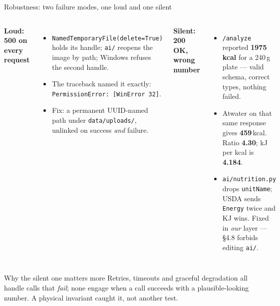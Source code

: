 \documentclass[aspectratio=169,11pt]{beamer}
\begin{document}
\begin{frame}{Robustness: two failure modes, one loud and one silent}
  \begin{columns}[T,onlytextwidth]
  \textbf{Loud: 500 on every request}
  \begin{itemize}\setlength\itemsep{0.2em}\small
    \item \texttt{NamedTemporaryFile(delete=True)} holds its handle; \texttt{ai/} reopens the image by path; Windows refuses the second handle.
    \item The traceback named it exactly: \texttt{PermissionError: [WinError 32]}.
    \item Fix: a permanent UUID-named path under \texttt{data/uploads/}, unlinked on success \emph{and} failure.
  \end{itemize}

  \textbf{Silent: 200 OK, wrong number}
  \begin{itemize}\setlength\itemsep{0.2em}\small
    \item \texttt{/analyze} reported \textbf{1975\,kcal} for a 240\,g plate --- valid schema, correct types, nothing failed.
    \item Atwater on that same response gives \textbf{459}\,kcal. Ratio \textbf{4.30}; kJ per kcal is \textbf{4.184}.
    \item \texttt{ai/nutrition.py} drops \texttt{unitName}; USDA sends \texttt{Energy} twice and KJ wins. Fixed in \emph{our} layer --- \S4.8 forbids editing \texttt{ai/}.
  \end{itemize}
  \end{columns}

  \vspace{0.2em}
  \begin{block}{Why the silent one matters more}
    \small Retries, timeouts and graceful degradation all handle calls that \emph{fail}; none engage when a call succeeds with a plausible-looking number. A physical invariant caught it, not another test.
  \end{block}
\end{frame}
\end{document}

